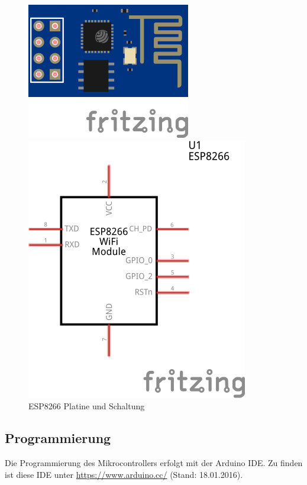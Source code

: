\begin{figure}
	\centering
	\begin{minipage}{0.45\textwidth}
			\includegraphics[scale=1.5]{Abbildungen/ESP8266A}
	\end{minipage}
	\hfill
	\begin{minipage}{0.45\textwidth} 
			\includegraphics[scale=1.5]{Abbildungen/ESP8266}
	\end{minipage}
	\caption{ESP8266 Platine und Schaltung}
	\label{fig:ESP8266}
\end{figure}

\subsection{Programmierung}
Die Programmierung des Mikrocontrollers erfolgt mit der Arduino IDE.
Zu finden ist diese IDE unter \url{https://www.arduino.cc/} (Stand: 18.01.2016).

